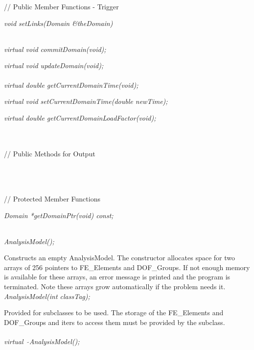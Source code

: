 // Public Member Functions - Trigger  

{\em void setLinks(Domain \&theDomain)} 

\\
{\em virtual void commitDomain(void);} 

{\em virtual void updateDomain(void);}\\ 

\\ 
{\em virtual double getCurrentDomainTime(void);} 

{\em virtual void   setCurrentDomainTime(double newTime);}

{\em virtual double getCurrentDomainLoadFactor(void);}

\\ \\
// Public Methods for Output

\\ 
\\  \\
// Protected Member Functions  

{\em Domain *getDomainPtr(void) const;} 




  \\
{\em AnalysisModel();}  

Constructs an empty AnalysisModel. The constructor allocates
space for two arrays of 256 pointers to FE\_Elements and DOF\_Groups.
If not enough memory is available for these arrays, an error message
is printed and the program is terminated. Note these arrays grow
automatically if the problem needs it.\\

{\em AnalysisModel(int classTag);}  

Provided for subclasses to be used. The storage of the FE\_Elements
and DOF\_Groups and iters to access them must be provided by the
subclass. \\

  \\
{\em virtual~ $\tilde{}$AnalysisModel();}  


